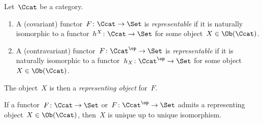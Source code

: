 \begin{definition}
  Let~$\Ccat$ be a category.
  \begin{enumerate}
    \item
      A (covariant) functor~$F \colon \Ccat \to \Set$ is \emph{representable} if it is naturally isomorphic to a functor~$h^X \colon \Ccat \to \Set$ for some object~$X \in \Ob(\Ccat)$.
    \item
      A (contravariant) functor~$F \colon \Ccat^\op \to \Set$ is \emph{representable} if it is naturally isomorphic to a functor~$h_X \colon \Ccat^\op \to \Set$ for some object~$X \in \Ob(\Ccat)$.
  \end{enumerate}
  The object~$X$ is then a \emph{representing object} for~$F$.
\end{definition}


\begin{remarknonum}
  If a functor~$F \colon \Ccat \to \Set$ or~$F \colon \Ccat^\op \to \Set$ admits a representing object~$X \in \Ob(\Ccat)$, then~$X$ is unique up to unique isomorphism.
\end{remarknonum}




